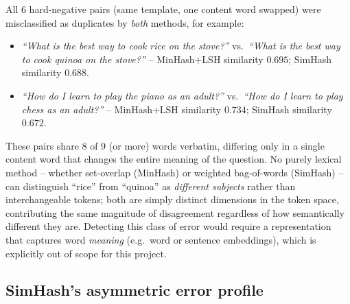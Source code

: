 \documentclass[11pt]{article}
\begin{document}
All 6 hard-negative pairs (same template, one content word swapped) were misclassified as duplicates by
\emph{both} methods, for example:

\begin{itemize}
    \item \emph{``What is the best way to cook rice on the stove?''} vs.\ \emph{``What is the best way to
          cook quinoa on the stove?''} -- MinHash+LSH similarity $0.695$; SimHash similarity $0.688$.
    \item \emph{``How do I learn to play the piano as an adult?''} vs.\ \emph{``How do I learn to play
          chess as an adult?''} -- MinHash+LSH similarity $0.734$; SimHash similarity $0.672$.
\end{itemize}

These pairs share 8 of 9 (or more) words verbatim, differing only in a single content word that changes
the entire meaning of the question. No purely lexical method -- whether set-overlap (MinHash) or weighted
bag-of-words (SimHash) -- can distinguish ``rice'' from ``quinoa'' as \emph{different subjects} rather than
interchangeable tokens; both are simply distinct dimensions in the token space, contributing the same
magnitude of disagreement regardless of how semantically different they are. Detecting this class of error
would require a representation that captures word \emph{meaning} (e.g.\ word or sentence embeddings),
which is explicitly out of scope for this project.

\subsection{SimHash's asymmetric error profile}
\end{document}
